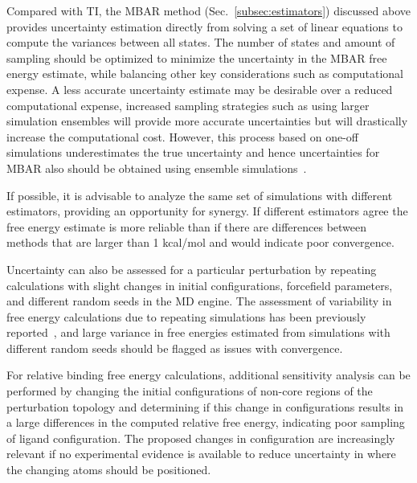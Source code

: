 Compared with TI, the MBAR method (Sec.~\ref{subsec:estimators}) discussed above provides uncertainty estimation directly from solving a set of linear equations to compute the variances between all states. 
The number of states and amount of sampling should be optimized to minimize the uncertainty in the MBAR free energy estimate, while balancing other key considerations such as computational expense. 
A less accurate uncertainty estimate may be desirable over a reduced computational expense, increased sampling strategies such as using larger simulation ensembles will provide more accurate uncertainties but will drastically increase the computational cost. 
However, this process based on one-off simulations underestimates the true uncertainty and hence uncertainties for MBAR also should be obtained using ensemble simulations~\cite{bhati2018, wade2022}.

If possible, it is advisable to analyze the same set of simulations with different estimators, providing an opportunity for synergy. If different estimators agree the free energy estimate is more reliable than if there are differences between methods that are larger than 1 kcal/mol and would indicate poor convergence. 

Uncertainty can also be assessed for a particular perturbation by repeating calculations with slight changes in initial configurations, forcefield parameters, and different random seeds in the MD engine. 
The assessment of variability in free energy calculations due to repeating simulations has been previously reported~\cite{aldeghi2019accurate,paliwal2011benchmark,mey2016blinded,mey2018impact, bhati2017, bhati2018, bhati2022, bhati2025}, and large variance in free energies estimated from simulations with different random seeds should be flagged as issues with convergence. 

For relative binding free energy calculations, additional sensitivity analysis can be performed by changing the initial configurations of non-core regions of the perturbation topology and determining if this change in configurations results in a large differences in the computed relative free energy, indicating poor sampling of ligand configuration.
The proposed changes in configuration are increasingly relevant if no experimental evidence is available to reduce uncertainty in where the changing atoms should be positioned.

